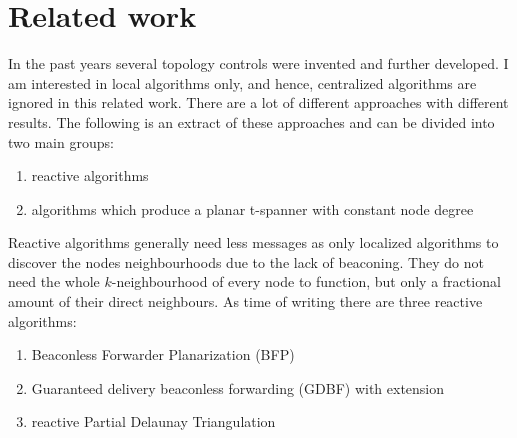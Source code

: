 

%



\section{Related work}

In the past years several topology controls were invented and further developed.
I am interested in local algorithms only, and hence, centralized algorithms are ignored in this related work.
There are a lot of different approaches with different results.
The following is an extract of these approaches and can be divided into two main groups:
\begin{enumerate}
\item reactive algorithms
\item algorithms which produce a planar t-spanner with constant node degree
\end{enumerate}

Reactive algorithms generally need less messages as only localized algorithms to discover the nodes neighbourhoods due to the lack of beaconing.
They do not need the whole $k $-neighbourhood of every node to function, but only a fractional amount of their direct neighbours.
As time of writing there are three reactive algorithms:
\begin{enumerate}
\item Beaconless Forwarder Planarization (BFP)
\item Guaranteed delivery beaconless forwarding (GDBF) with extension
\item reactive Partial Delaunay Triangulation
\end{enumerate}

